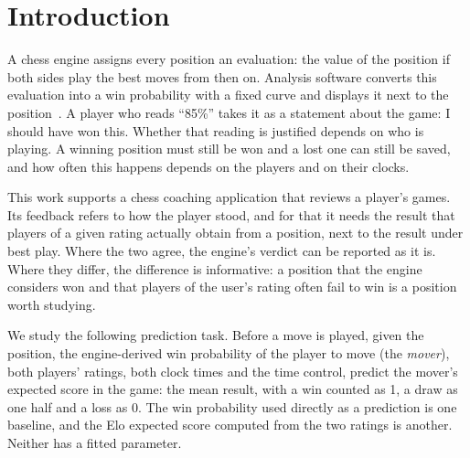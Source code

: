\documentclass[11pt]{article}
\begin{document}
\section{Introduction}
\label{sec:intro}

A chess engine assigns every position an evaluation: the value of the
position if both sides play the best moves from then on. Analysis software
converts this evaluation into a win probability with a fixed curve and
displays it next to the position~\cite{lichessaccuracy}. A player who reads
``85\%'' takes it as a statement about the game: I should have won this.
Whether that reading is justified depends on who is playing. A winning
position must still be won and a lost one can still be saved, and how often
this happens depends on the players and on their clocks.

This work supports a chess coaching application that reviews a player's
games. Its feedback refers to how the player stood, and for that it needs the
result that players of a given rating actually obtain from a position, next
to the result under best play. Where the two agree, the engine's verdict can
be reported as it is. Where they differ, the difference is informative: a
position that the engine considers won and that players of the user's rating
often fail to win is a position worth studying.

We study the following prediction task. Before a move is played, given the
position, the engine-derived win probability of the player to move (the
\emph{mover}), both players' ratings, both clock times and the time control,
predict the mover's expected score in the game: the mean result, with a win
counted as 1, a draw as one half and a loss as 0. The win probability used
directly as a prediction is one baseline, and the Elo expected score computed
from the two ratings is another. Neither has a fitted parameter.
\end{document}
